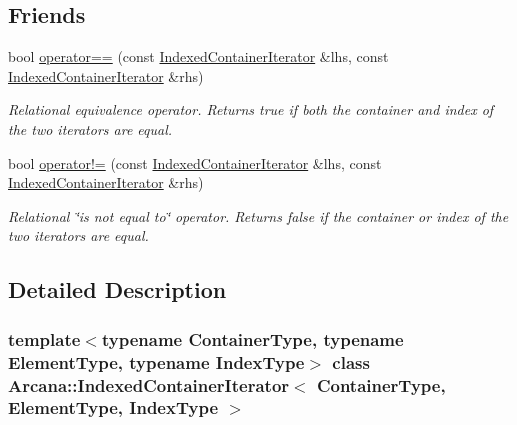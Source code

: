 \subsection*{Friends}
\begin{DoxyCompactItemize}
\item 
\mbox{\label{class_arcana_1_1_indexed_container_iterator_a194105b67fc3a701928282938eea8f91}} 
bool \mbox{\hyperlink{class_arcana_1_1_indexed_container_iterator_a194105b67fc3a701928282938eea8f91}{operator==}} (const \mbox{\hyperlink{class_arcana_1_1_indexed_container_iterator}{Indexed\+Container\+Iterator}} \&lhs, const \mbox{\hyperlink{class_arcana_1_1_indexed_container_iterator}{Indexed\+Container\+Iterator}} \&rhs)
\begin{DoxyCompactList}\small\item\em Relational equivalence operator. Returns true if both the container and index of the two iterators are equal. \end{DoxyCompactList}\item 
\mbox{\label{class_arcana_1_1_indexed_container_iterator_a3f8f1d6ae101307b62e1f5709cc10eb4}} 
bool \mbox{\hyperlink{class_arcana_1_1_indexed_container_iterator_a3f8f1d6ae101307b62e1f5709cc10eb4}{operator!=}} (const \mbox{\hyperlink{class_arcana_1_1_indexed_container_iterator}{Indexed\+Container\+Iterator}} \&lhs, const \mbox{\hyperlink{class_arcana_1_1_indexed_container_iterator}{Indexed\+Container\+Iterator}} \&rhs)
\begin{DoxyCompactList}\small\item\em Relational \char`\"{}is not equal to\char`\"{} operator. Returns false if the container or index of the two iterators are equal. \end{DoxyCompactList}\end{DoxyCompactItemize}


\subsection{Detailed Description}
\subsubsection*{template$<$typename Container\+Type, typename Element\+Type, typename Index\+Type$>$\newline
class Arcana\+::\+Indexed\+Container\+Iterator$<$ Container\+Type, Element\+Type, Index\+Type $>$}

